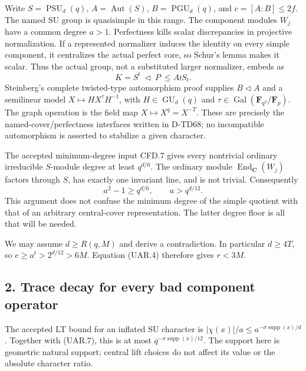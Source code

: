 Write \(S=\operatorname{PSU}_d(q)\),
\(A=\operatorname{Aut}(S)\), \(B=\operatorname{PGU}_d(q)\), and
\(c=[A:B]\le2f\). The named SU group is quasisimple in this range.
The component modules \(W_j\) have a common degree \(a>1\).
Perfectness kills scalar discrepancies in projective normalization.
If a represented normalizer induces the identity on every simple
component, it centralizes the actual perfect core, so Schur's lemma
makes it scalar. Thus the actual group, not a substituted larger
normalizer, embeds as
\[
             K=S^t\ \triangleleft\ P\ \le A\wr S_t.
 \tag{UAR.6}
\]
Steinberg's complete twisted-type automorphism proof
\cite[pp.~607--608 and complete Section~7, pp.~613--614]{PFL:Steinberg1960}
supplies
\(B\triangleleft A\) and a semilinear model
\(X\mapsto H X^\tau H^{-1}\), with \(H\in\operatorname{GU}_d(q)\)
and \(\tau\in\operatorname{Gal}(\mathbf F_{q^2}/\mathbf F_p)\).
The graph operation is the field map \(X\mapsto X^q=X^{-T}\).
These are precisely the named-cover/perfectness interfaces written
in D-TD68; no incompatible automorphism is asserted to stabilize a
given character.

The accepted minimum-degree input CFD.7 gives every nontrivial
ordinary irreducible \(S\)-module degree at least \(q^{d/6}\).
The ordinary module \(\operatorname{End}_{\mathbf C}(W_j)\) factors
through \(S\), has exactly one invariant line, and is not trivial.
Consequently
\[
                      a^2-1\ge q^{d/6},\qquad a>q^{d/12}.
 \tag{UAR.7}
\]
This argument does not confuse the minimum degree of the simple
quotient with that of an arbitrary central-cover representation.
The latter degree floor is all that will be needed.

We may assume \(d\ge R(q,M)\) and derive a contradiction. In
particular \(d\ge4T\), so \(e\ge a^t>2^{d/12}>6M\).
Equation (UAR.4) therefore gives \(r<3M\).

\subsection*{2. Trace decay for every bad component operator}

The accepted LT bound for an inflated SU character
\cite[Theorem~5.5 and complete proof, author pp.~25--26]{UNW:LT2024} is
\( |\chi(x)|/a\le a^{-\sigma\operatorname{supp}(x)/d}\).
Together with (UAR.7), this is at most
\(q^{-\sigma\operatorname{supp}(x)/12}\).
The support here is geometric natural support; central lift choices
do not affect its value or the absolute character ratio.

